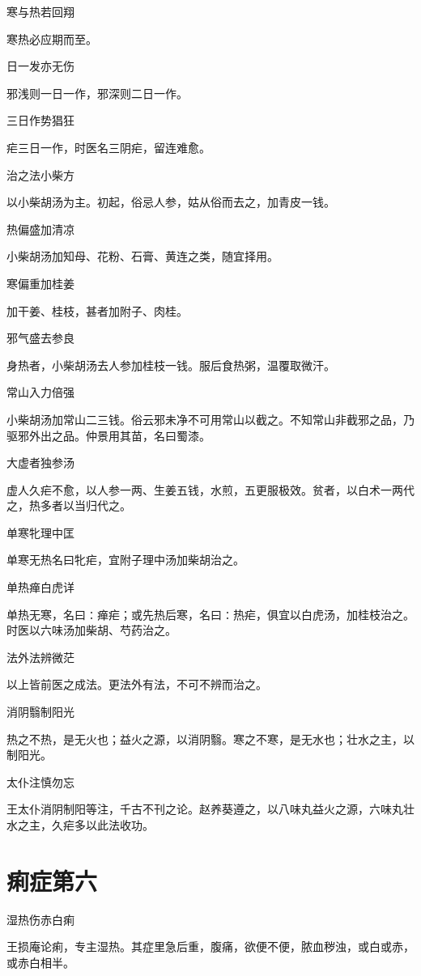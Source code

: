 \documentclass[a4paper,12pt,UTF8,twoside]{ctexbook}
\begin{document}
	寒与热若回翔
	
  寒热必应期而至。
	
	日一发亦无伤
	
  邪浅则一日一作，邪深则二日一作。
	
	三日作势猖狂
	
  疟三日一作，时医名三阴疟，留连难愈。
	
	治之法小柴方
	
  以小柴胡汤为主。初起，俗忌人参，姑从俗而去之，加青皮一钱。
	
	热偏盛加清凉
	
  小柴胡汤加知母、花粉、石膏、黄连之类，随宜择用。
	
	寒偏重加桂姜
	
  加干姜、桂枝，甚者加附子、肉桂。
	
	邪气盛去参良
	
  身热者，小柴胡汤去人参加桂枝一钱。服后食热粥，温覆取微汗。
	
	常山入力倍强
	
  小柴胡汤加常山二三钱。俗云邪未净不可用常山以截之。不知常山非截邪之品，乃驱邪外出之品。仲景用其苗，名曰蜀漆。
	
	大虚者独参汤
	
  虚人久疟不愈，以人参一两、生姜五钱，水煎，五更服极效。贫者，以白术一两代之，热多者以当归代之。
	
	单寒牝理中匡
	
  单寒无热名曰牝疟，宜附子理中汤加柴胡治之。
	
	单热瘅白虎详
	
  单热无寒，名曰∶瘅疟；或先热后寒，名曰∶热疟，俱宜以白虎汤，加桂枝治之。时医以六味汤加柴胡、芍药治之。
	
	法外法辨微茫
	
  以上皆前医之成法。更法外有法，不可不辨而治之。
	
	消阴翳制阳光
	
  热之不热，是无火也；益火之源，以消阴翳。寒之不寒，是无水也；壮水之主，以制阳光。
	
	太仆注慎勿忘
	
  王太仆消阴制阳等注，千古不刊之论。赵养葵遵之，以八味丸益火之源，六味丸壮水之主，久疟多以此法收功。
	
  \chapter{痢症第六}
  湿热伤赤白痢
  
  王损庵论痢，专主湿热。其症里急后重，腹痛，欲便不便，脓血秽浊，或白或赤，或赤白相半。
    
\end{document}
